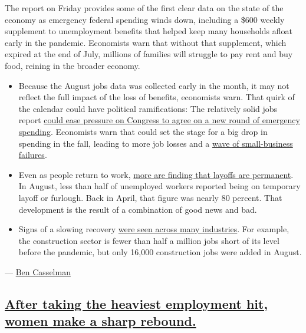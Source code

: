 The report on Friday provides some of the first clear data on the state
of the economy as emergency federal spending winds down, including a
\$600 weekly supplement to unemployment benefits that helped keep many
households afloat early in the pandemic. Economists warn that without
that supplement, which expired at the end of July, millions of families
will struggle to pay rent and buy food, reining in the broader economy.

\begin{itemize}
\tightlist
\item
  Because the August jobs data was collected early in the month, it may
  not reflect the full impact of the loss of benefits, economists warn.
  That quirk of the calendar could have political ramifications: The
  relatively solid jobs report
  \href{https://www.nytimes3xbfgragh.onion/2020/09/04/business/economy/jobs-report.html}{could
  ease pressure on Congress to agree on a new round of emergency
  spending}. Economists warn that could set the stage for a big drop in
  spending in the fall, leading to more job losses and a
  \href{https://www.nytimes3xbfgragh.onion/2020/09/01/business/economy/small-businesses-coronavirus.html}{wave
  of small-business failures}.
\end{itemize}

\begin{itemize}
\item
  Even as people return to work,
  \href{https://www.nytimes3xbfgragh.onion/2020/09/04/business/even-as-people-return-to-work-more-find-that-layoffs-are-permanent.html}{more
  are finding that layoffs are permanent}. In August, less than half of
  unemployed workers reported being on temporary layoff or furlough.
  Back in April, that figure was nearly 80 percent. That development is
  the result of a combination of good news and bad.
\item
  Signs of a slowing recovery
  \href{https://www.nytimes3xbfgragh.onion/2020/09/04/business/augusts-slowdown-in-job-growth-spanned-many-industries.html}{were
  seen across many industries}. For example, the construction sector is
  fewer than half a million jobs short of its level before the pandemic,
  but only 16,000 construction jobs were added in August.
\end{itemize}

--- \href{https://www.nytimes3xbfgragh.onion/by/ben-casselman}{Ben
Casselman}

\hypertarget{after-taking-the-heaviest-employment-hit-women-make-a-sharp-rebound}{%
\subsection{\texorpdfstring{\protect\hyperlink{after-taking-the-heaviest-employment-hit-women-make-a-sharp-rebound}{After
taking the heaviest employment hit, women make a sharp
rebound.}}{After taking the heaviest employment hit, women make a sharp rebound.}}\label{after-taking-the-heaviest-employment-hit-women-make-a-sharp-rebound}}

